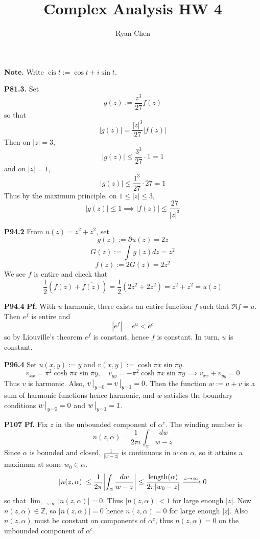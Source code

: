 \documentclass{article}
\title{Complex Analysis HW 4}
\author{Ryan Chen}
\def\mbb#1{\mathbb{#1}}
\def\tbf#1{\textbf{#1}}
\def\bZ{\mbb{Z}}
\newcommand{\br}[1]{\left(#1\right)}
\newcommand{\pf}{\tbf{Pf. }}
\newcommand{\imp}{\implies}
\newcommand{\sep}[1][.5cm]{\vspace{#1}}
\renewcommand{\bar}{\overline}
\DeclareMathOperator{\cis}{cis}
\begin{document}
\maketitle



\tbf{Note.} Write $\cis t:=\cos t+i\sin t$.
\sep



\tbf{P81.3.} Set
$$g(z) := \frac{z^3}{27}f(z)$$
so that
$$|g(z)| = \frac{|z|^3}{27}|f(z)|$$
Then on $|z|=3$,
$$|g(z)| \le \frac{3^3}{27}\cdot 1 = 1$$
and on $|z|=1$,
$$|g(z)| \le \frac{1^3}{27}\cdot 27 = 1$$
Thus by the maximum principle, on $1\le |z|\le 3$,
$$|g(z)|\le 1 \imp |f(z)| \le \frac{27}{|z|^3}$$



\tbf{P94.2} From $u(z)=z^2+\bar z^2$, set
$$g(z) := \partial u(z) = 2z$$
$$G(z) := \int g(z)dz = z^2$$
$$f(z) := 2G(z) = 2z^2$$
We see $f$ is entire and check that
$$\frac12\br{f(z)+\bar{f(z)}} = \frac12\br{2z^2+2\bar z^2} = z^2 + \bar z^2 = u(z)$$
\sep



\tbf{P94.4} \pf With $u$ harmonic, there exists an entire function $f$ such that $\Re f=u$. Then $e^f$ is entire and
$$|e^f| = e^u < e^c$$
so by Liouville's theorem $e^f$ is constant, hence $f$ is constant. In turn, $u$ is constant.
\sep



\tbf{P96.4} Set $u(x,y):=y$ and $v(x,y):=\cosh\pi x\sin\pi y$.
$$v_{xx} = \pi^2\cosh\pi x\sin\pi y,
\quad v_{yy} = -\pi^2\cosh\pi x\sin\pi y
\imp v_{xx} + v_{yy} = 0$$
Thus $v$ is harmonic. Also, $v\eval_{y=0}=v\eval_{y=1}=0$. Then the function $w:=u+v$ is a sum of harmonic functions hence harmonic, and $w$ satisfies the boundary conditions $w\eval_{y=0}=0$ and $w\eval_{y=1}=1$.
\sep



\tbf{P107} \pf Fix $z$ in the unbounded component of $\alpha^c$. The winding number is
$$n(z,\alpha) = \frac{1}{2\pi i}\int_\alpha \frac{dw}{w-z}$$
Since $\alpha$ is bounded and closed, $\frac{1}{|w-z|}$ is continuous in $w$ on $\alpha$, so it attains a maximum at some $w_0\in\alpha$.
$$|n(z,\alpha)| \le \frac{1}{2\pi}\abs{\int_\alpha\frac{dw}{w-z}}
\le \frac{\mathrm{length}(\alpha)}{2\pi|w_0-z|}
\app[z][\infty] 0$$
so that $\lim_{z\to\infty}|n(z,\alpha)|=0$. Thus $|n(z,\alpha)|<1$ for large enough $|z|$. Now $n(z,\alpha)\in\bZ$, so $|n(z,\alpha)|=0$ hence $n(z,\alpha)=0$ for large enough $|z|$. Also $n(z,\alpha)$ must be constant on components of $\alpha^c$, thus $n(z,\alpha)=0$ on the unbounded component of $\alpha^c$.
\sep
\end{document}

